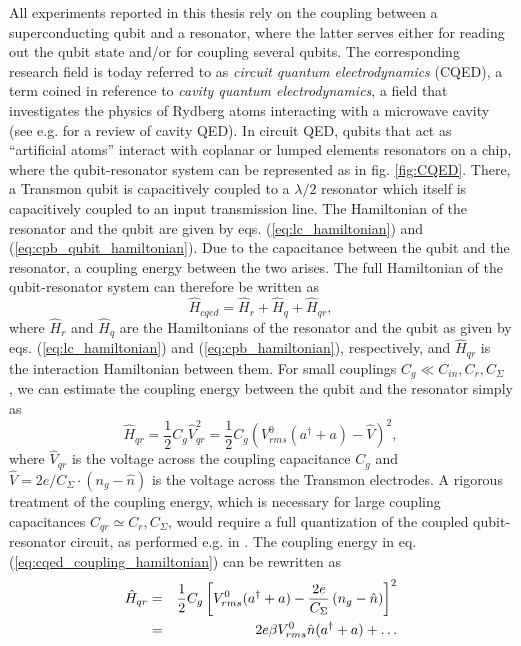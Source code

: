 All experiments reported in this thesis rely on the coupling between a superconducting qubit and a resonator, where the latter serves either for reading out the qubit state and/or for coupling several qubits. The corresponding research field is today referred to as {\it circuit quantum electrodynamics} (CQED), a term coined in reference to {\it cavity quantum electrodynamics}, a field that investigates the physics of Rydberg atoms interacting with a microwave cavity (see e.g. \citep{mabuchi_cavity_2002,walther_cavity_2006} for a review of cavity QED). In circuit QED, qubits that act as ``artificial atoms'' interact with coplanar or lumped elements resonators on a chip, where the qubit-resonator system can be represented as in fig. \ref{fig:CQED}. There, a Transmon qubit is capacitively coupled to a $\lambda/2$ resonator which itself is capacitively coupled to an input transmission line. The Hamiltonian of the resonator and the qubit are given by eqs. (\ref{eq:lc_hamiltonian}) and (\ref{eq:cpb_qubit_hamiltonian}). Due to the capacitance between the qubit and the resonator, a coupling energy between the two arises. The full Hamiltonian of the qubit-resonator system can therefore be written as
%
\begin{equation}
\hat{H}_{cqed} = \hat{H}_r+\hat{H}_q+\hat{H}_{qr},
\end{equation}
%
where $\hat{H}_{r}$ and $\hat{H}_q$ are the Hamiltonians of the resonator and the qubit as given by eqs. (\ref{eq:lc_hamiltonian}) and (\ref{eq:cpb_hamiltonian}), respectively, and $\hat{H}_{qr}$ is the interaction Hamiltonian between them. For small couplings $C_g \ll C_{in},C_r,C_\Sigma$ , we can estimate the coupling energy between the qubit and the resonator simply as
%
\begin{equation}
\hat{H}_{qr} = \frac{1}{2}C_{g}\hat{V}_{qr}^2 = \frac{1}{2}C_g\left(V^0_{rms}(a^\dagger+a)-\hat{V}\right)^2, \label{eq:cqed_coupling_hamiltonian}
\end{equation}
%
where $\hat{V}_{qr}$ is the voltage across the coupling capacitance $C_g$ and $\hat{V}=2e/C_\Sigma \cdot(n_g-\hat{n})$ is the voltage across the Transmon electrodes. A rigorous treatment of the coupling energy, which is necessary for large coupling capacitances $C_{qr}\simeq C_{r},C_\Sigma$, would require a full quantization of the coupled qubit-resonator circuit, as performed e.g. in \citep{nguyen_cooper_2008}. The coupling energy in eq. (\ref{eq:cqed_coupling_hamiltonian}) can be rewritten as
%
\begin{eqnarray}
\hat{H}_{qr} & = & \frac{1}{2}C_g\left[V_{rms}^0(a^\dagger+a)-\frac{2e}{C_\Sigma}\left(n_g-\hat{n}\right)\right]^2 \notag \\
       & = & 2e \beta V_{rms}^0\hat{n}(a^\dagger+a) + \hdots \label{eq:cqed_coupling}
\end{eqnarray}

